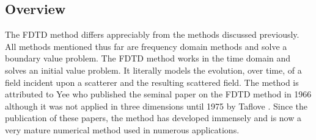 \documentclass[a4paper, 12pt]{article}
\begin{document}
	\subsection{Overview}
	\label{sec:numermeth:fdtd}
	The FDTD method differs appreciably
	from the methods discussed previously. All methods mentioned thus far
	are frequency domain methods and solve a boundary value problem. The
	FDTD method works in the time domain and solves an initial value
	problem. It literally models the evolution, over time, of a field
	incident upon a scatterer and the resulting scattered field. The
	method is attributed to Yee \cite{yee66ieeetransantprop302} who
	published the seminal paper on the FDTD method in 1966 although it
	was not applied in three dimensions until 1975 by Taflove
	\cite{taflove75ieeetransmicrotheoryandtech623,taflove75ieeetransmicrotheoryandtech888}.
	Since the publication of these papers, the method has developed
	immensely and is now a very mature numerical method used in numerous
	applications.
\end{document}
